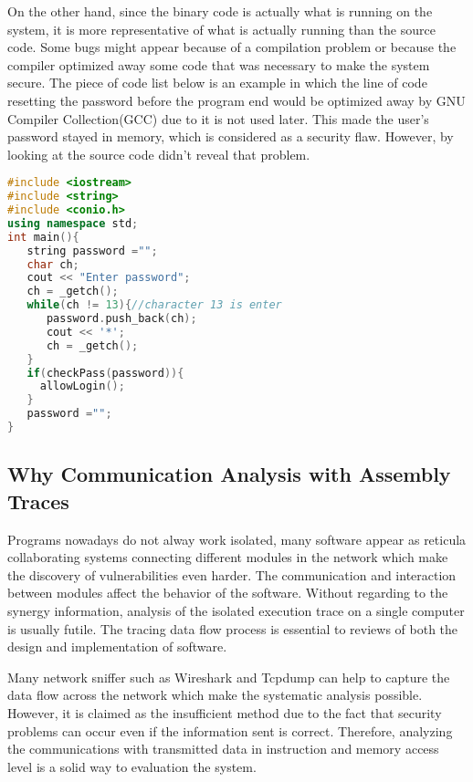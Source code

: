 On the other hand, since the binary code is actually what is running on the system, it is more representative of what is actually running than the source code.  Some bugs might appear because of a compilation problem or because the compiler optimized away some code that was
necessary to make the system secure. The piece of code list below is an example in which the line of code resetting the password before the program end would be optimized away by GNU Compiler Collection(GCC) due to it is not used later. This made the user's password stayed in memory, which is considered as a security flaw. However, by looking at the source code didn't reveal that problem.

\begin{lstlisting}[language=C++, caption= Password Fetching Example ]
#include <iostream>
#include <string>
#include <conio.h>
using namespace std;
int main(){
   string password ="";
   char ch;
   cout << "Enter password";
   ch = _getch();
   while(ch != 13){//character 13 is enter
      password.push_back(ch);
      cout << '*';
      ch = _getch();
   }   
   if(checkPass(password)){
     allowLogin();
   }  
   password ="";
}
\end{lstlisting}

\subsection{Why Communication Analysis with Assembly Traces}
Programs nowadays do not alway work isolated,  many software  appear as  reticula collaborating systems connecting different modules in the network\cite{PhysRevE.68.046116} which make the discovery of vulnerabilities even harder. The communication and interaction between modules affect the behavior of the software. Without regarding to the synergy information, analysis of the isolated execution trace on a single computer is usually futile. The tracing data flow process is essential to reviews of both the design and implementation of software.

Many network sniffer such as Wireshark\cite{_wireshark_????} and Tcpdump\cite{tcpdump_tcpdump/libpcap_????} can help to capture the data flow across the network which make the systematic analysis possible. However, it is claimed as the insufficient method due to the fact that security problems can occur even if the information sent is correct. Therefore, analyzing the communications with transmitted data in instruction and memory access level is a solid way to evaluation the system.

